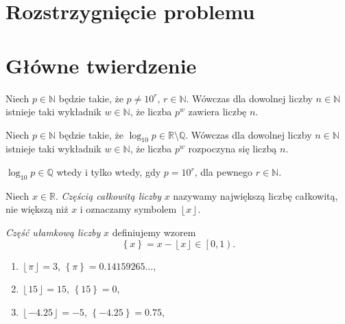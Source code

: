 \documentclass{beamer}
\newcommand{\enumsymbol}{$\triangleright$}
\newcommand{\R}{\mathbb{R}}
\newcommand{\Q}{\mathbb{Q}}
\newcommand{\N}{\mathbb{N}}
\newcommand{\define}[1]{\textit{#1}}
\newcommand{\floor}[1]{\!\left\lfloor #1 \right\rfloor}
\newcommand{\fracpart}[1]{\!\left\{ #1 \right\}}
\begin{document}
\section{Rozstrzygnięcie problemu}
\section{Główne twierdzenie}

\begin{frame}
  \begin{theorem}
    Niech $p \in \N$ będzie takie, że $p \not = 10^r$, $r \in \N$.
    Wówczas dla dowolnej liczby $n \in \N$ istnieje taki wykładnik $w \in \N$, że liczba $p^w$ zawiera liczbę $n$.
  \end{theorem}
  \begin{lemma}
    Niech $p \in \N$ będzie takie, że $\log_{10}p \in \R \setminus \Q$.
    Wówczas dla dowolnej liczby $n \in \N$ istnieje taki wykładnik $w \in \N$, że liczba $p^w$ rozpoczyna się liczbą $n$. 
  \end{lemma}
  \begin{lemma}
    $\log_{10}p \in \Q$ wtedy i tylko wtedy, gdy $p = 10^r$, dla pewnego $r \in \N$.
  \end{lemma}
\end{frame}

\begin{frame}
\begin{definition}
Niech $x \in \R$.
\define{Częścią całkowitą liczby} $x$ nazywamy największą liczbę całkowitą, nie większą niż $x$ i oznaczamy symbolem $\floor{x}$.

\define{Część ułamkową liczby} $x$ definiujemy wzorem
\begin{equation*}
\fracpart{x} = x-\floor{x} \in \left[0, 1\right).
\end{equation*}
\end{definition}
\begin{example}
  \begin{enumerate}[label=\enumsymbol]
    \item $\floor{\pi} = 3$, $\fracpart{\pi} = 0.14159265\ldots{}$,
    \item $\floor{15} = 15$, $\fracpart{15} = 0$,
    \item $\floor{-4.25} = -5$, $\fracpart{-4.25} = 0.75$, 
  \end{enumerate}
\end{example}
\end{frame}
\end{document}
